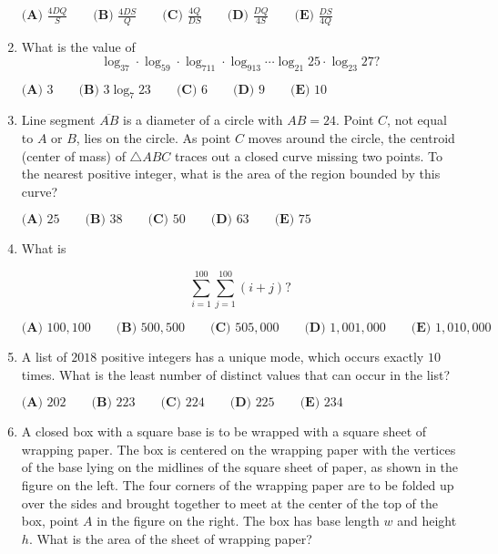 \documentclass{article}
\begin{document}
\begin{enumerate}[label=\arabic*., itemsep=0.5em]
\(\textbf{(A) } \frac{4DQ}{S} \qquad \textbf{(B) } \frac{4DS}{Q} \qquad \textbf{(C) } \frac{4Q}{DS} \qquad \textbf{(D) } \frac{DQ}{4S} \qquad \textbf{(E) } \frac{DS}{4Q}\)\par \vspace{0.5em}\item What is the value of 
\begin{equation*}
\log_37\cdot\log_59\cdot\log_711\cdot\log_913\cdots\log_{21}25\cdot\log_{23}27?
\end{equation*}

\(\textbf{(A) } 3 \qquad \textbf{(B) } 3\log_{7}23 \qquad \textbf{(C) } 6 \qquad \textbf{(D) } 9 \qquad \textbf{(E) } 10 \)\par \vspace{0.5em}\item Line segment \(\overline{AB}\) is a diameter of a circle with \(AB = 24\). Point \(C\), not equal to \(A\) or \(B\), lies on the circle. As point \(C\) moves around the circle, the centroid (center of mass) of \(\triangle ABC\) traces out a closed curve missing two points. To the nearest positive integer, what is the area of the region bounded by this curve?

\(\textbf{(A) } 25 \qquad \textbf{(B) } 38  \qquad \textbf{(C) } 50  \qquad \textbf{(D) } 63 \qquad \textbf{(E) } 75  \)\par \vspace{0.5em}\item What is

\begin{equation*}
\sum^{100}_{i=1} \sum^{100}_{j=1} (i+j) ?
\end{equation*}


\( \textbf{(A) }100{,}100 \qquad
\textbf{(B) }500{,}500\qquad
\textbf{(C) }505{,}000 \qquad
\textbf{(D) }1{,}001{,}000 \qquad
\textbf{(E) }1{,}010{,}000 \qquad \)\par \vspace{0.5em}\item A list of \(2018\) positive integers has a unique mode, which occurs exactly \(10\) times. What is the least number of distinct values that can occur in the list?

\( \textbf{(A) }202 \qquad
\textbf{(B) }223 \qquad
\textbf{(C) }224 \qquad
\textbf{(D) }225 \qquad
\textbf{(E) }234 \qquad \)\par \vspace{0.5em}\item A closed box with a square base is to be wrapped with a square sheet of wrapping paper. The box is centered on the wrapping paper with the vertices of the base lying on the midlines of the square sheet of paper, as shown in the figure on the left. The four corners of the wrapping paper are to be folded up over the sides and brought together to meet at the center of the top of the box, point \(A\) in the figure on the right. The box has base length \(w\) and height \(h\). What is the area of the sheet of wrapping paper?



\end{enumerate}
\end{document}

